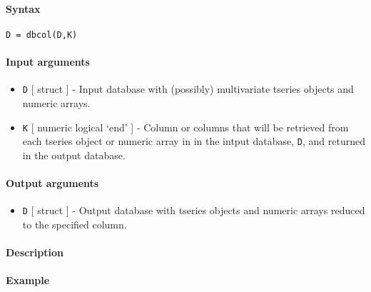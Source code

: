 


	\paragraph{Syntax}\label{syntax}

\begin{verbatim}
D = dbcol(D,K)
\end{verbatim}

\paragraph{Input arguments}\label{input-arguments}

\begin{itemize}
\item
  \texttt{D} {[} struct {]} - Input database with (possibly)
  multivariate tseries objects and numeric arrays.
\item
  \texttt{K} {[} numeric \textbar{} logical \textbar{} `end' {]} -
  Column or columns that will be retrieved from each tseries object or
  numeric array in in the intput database, \texttt{D}, and returned in
  the output database.
\end{itemize}

\paragraph{Output arguments}\label{output-arguments}

\begin{itemize}
\itemsep1pt\parskip0pt
\item
  \texttt{D} {[} struct {]} - Output database with tseries objects and
  numeric arrays reduced to the specified column.
\end{itemize}

\paragraph{Description}\label{description}

\paragraph{Example}\label{example}


